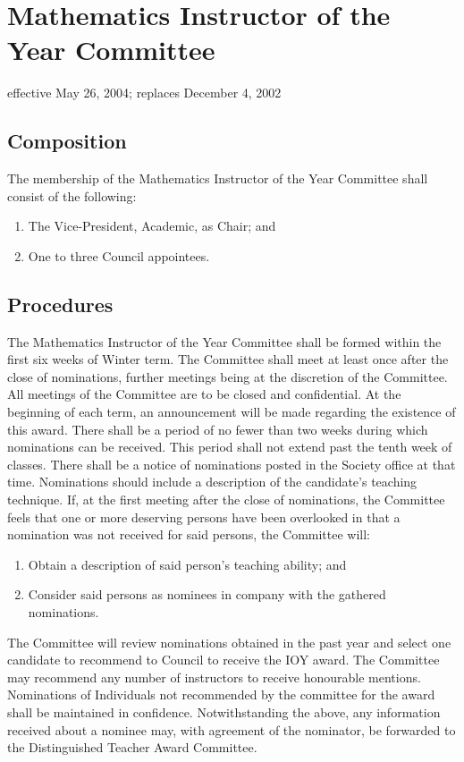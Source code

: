 \section{Mathematics Instructor of the Year Committee}
effective May 26, 2004; replaces December 4, 2002

\subsection{Composition}
The membership of the Mathematics Instructor of the Year Committee shall consist of the following:
\begin{enumerate}
\item The Vice-President, Academic, as Chair; and
\item One to three Council appointees.
\end{enumerate}


\subsection{Procedures}
The Mathematics Instructor of the Year Committee shall be formed within the first six weeks of Winter term. The Committee shall meet at least once after the close of nominations, further meetings being at the discretion of the Committee. All meetings of the Committee are to be closed and confidential.
At the beginning of each term, an announcement will be made regarding the existence of this award.
There shall be a period of no fewer than two weeks during which nominations can be received. This period shall not extend past the tenth week of classes. There shall be a notice of nominations posted in the Society office at that time. Nominations should include a description of the candidate's teaching technique.
If, at the first meeting after the close of nominations, the Committee feels that one or more deserving persons have been overlooked in that a nomination was not received for said persons, the Committee will:
\begin{enumerate}
\item Obtain a description of said person’s teaching ability; and
\item Consider said persons as nominees in company with the gathered nominations.
\end{enumerate}
The Committee will review nominations obtained in the past year and select one candidate to recommend to Council to receive the IOY award. The Committee may recommend any number of instructors to receive honourable mentions.
Nominations of Individuals not recommended by the committee for the award shall be maintained in confidence.
Notwithstanding the above, any information received about a nominee may, with agreement of the nominator, be forwarded to the Distinguished Teacher Award Committee.

